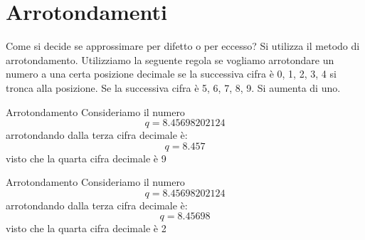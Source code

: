 \section{Arrotondamenti}
Come si decide se approssimare per difetto o per eccesso? Si utilizza il metodo di arrotondamento. Utilizziamo la seguente regola se vogliamo arrotondare un numero a una certa posizione decimale se la successiva cifra è \num{0}, \num{1}, \num{2}, \num{3}, \num{4} si tronca alla posizione. Se la successiva cifra è \num{5}, \num{6}, \num{7}, \num{8}, \num{9}. Si aumenta di uno.
  \begin{esempiot}{Arrotondamento}{}
	Consideriamo il numero\[q=\num{8.45698202124}\]
	arrotondando dalla terza cifra decimale è:
	\[q=\num{8.457}\] visto che la quarta cifra decimale è \num{9}
\end{esempiot}
  \begin{esempiot}{Arrotondamento}{}
	Consideriamo il numero\[q=\num{8.45698202124}\]
	arrotondando dalla terza cifra decimale è:
	\[q=\num{8.45698}\] visto che la quarta cifra decimale è \num{2}
\end{esempiot}
